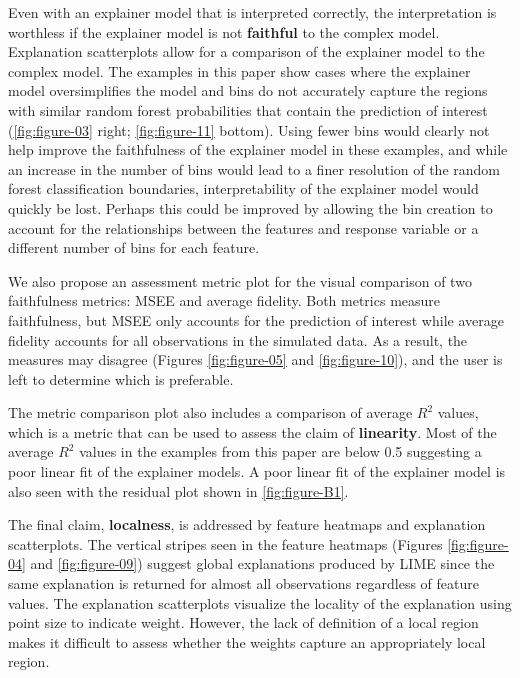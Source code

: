 \documentclass[AMS,STIX2COL]{WileyNJD-v2}\usepackage[]{graphicx}\usepackage[]{color}
\begin{document}
Even with an explainer model that is interpreted correctly, the interpretation is worthless if the explainer model is not \textbf{faithful} to the complex model. Explanation scatterplots allow for a comparison of the explainer model to the complex model. The examples in this paper show cases where the explainer model oversimplifies the model and bins do not accurately capture the regions with similar random forest probabilities that contain the prediction of interest (\autoref{fig:figure-03} right; \autoref{fig:figure-11} bottom). Using fewer bins would clearly not help improve the faithfulness of the explainer model in these examples, and while an increase in the number of bins would lead to a finer resolution of the random forest classification boundaries, interpretability of the explainer model would quickly be lost. Perhaps this could be improved by allowing the bin creation to account for the relationships between the features and response variable or a different number of bins for each feature.

We also propose an assessment metric plot for the visual comparison of two faithfulness metrics: MSEE and average fidelity. Both metrics measure faithfulness, but MSEE only accounts for the prediction of interest while average fidelity accounts for all observations in the simulated data. As a result, the measures may disagree (Figures \ref{fig:figure-05} and \ref{fig:figure-10}), and the user is left to determine which is preferable. 

The metric comparison plot also includes a comparison of average $R^2$ values, which is a metric that can be used to assess the claim of \textbf{linearity}. Most of the average $R^2$ values in the examples from this paper are below 0.5 suggesting a poor linear fit of the explainer models. A poor linear fit of the explainer model is also seen with the residual plot shown in \autoref{fig:figure-B1}.

The final claim, \textbf{localness}, is addressed by feature heatmaps and explanation scatterplots. The vertical stripes seen in the feature heatmaps (Figures \ref{fig:figure-04} and \ref{fig:figure-09}) suggest global explanations produced by LIME since the same explanation is returned for almost all observations regardless of feature values. The explanation scatterplots visualize the locality of the explanation using point size to indicate weight. However, the lack of definition of a local region makes it difficult to assess whether the weights capture an appropriately local region.
\end{document}
